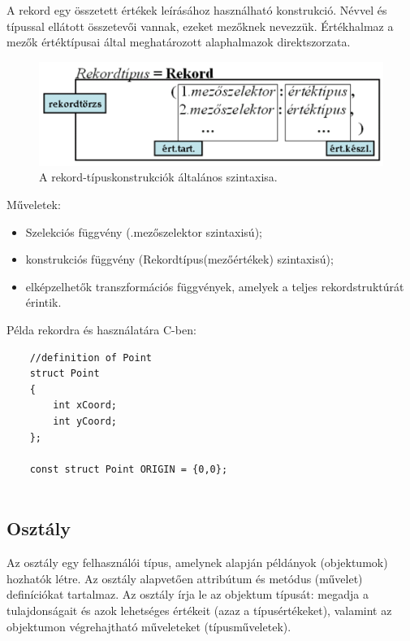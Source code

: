 \documentclass[margin=0px]{article}
\begin{document}
A rekord egy összetett értékek leírásához használható konstrukció. Névvel és típussal ellátott összetevői vannak, ezeket mezőknek nevezzük.
Értékhalmaz a mezők értéktípusai által meghatározott alaphalmazok direktszorzata.

\begin{figure}[H]
    \centering
    \includegraphics[width=0.7\linewidth]{img/rekord}
    \caption{A rekord-típuskonstrukciók általános szintaxisa.}
    \label{fig:rekord}
\end{figure}

\noindent Műveletek:
\begin{itemize}
    \item	Szelekciós függvény (.mezőszelektor szintaxisú);

    \item	konstrukciós függvény (Rekordtípus(mezőértékek) szintaxisú);

    \item	elképzelhetők transzformációs függvények, amelyek a teljes rekordstruktúrát érintik.
\end{itemize}

\noindent Példa rekordra és használatára C-ben:
\begin{verbatim}
    //definition of Point
    struct Point 
    {
        int xCoord;
        int yCoord;
    };
    
    const struct Point ORIGIN = {0,0};
        
\end{verbatim}

\subsection{Osztály}

Az osztály egy felhasználói típus, amelynek alapján példányok (objektumok)
hozhatók létre. Az osztály alapvetően attribútum és metódus (művelet) definíciókat
tartalmaz. Az osztály írja le az objektum típusát: megadja a tulajdonságait és azok
lehetséges értékeit (azaz a típusértékeket), valamint az objektumon végrehajtható műveleteket (típusműveletek).\\
\end{document}
